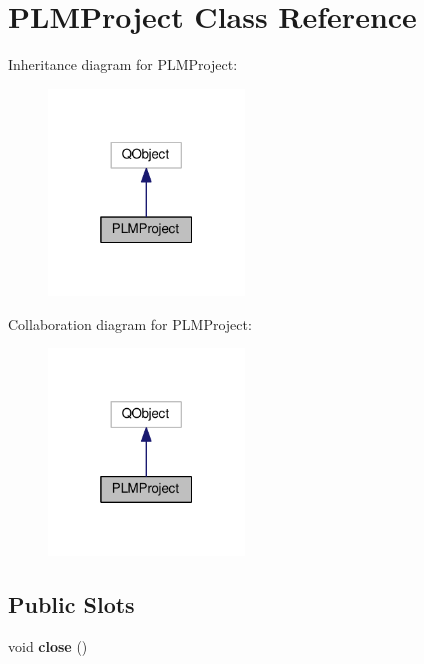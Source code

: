 \hypertarget{class_p_l_m_project}{}\section{P\+L\+M\+Project Class Reference}
\label{class_p_l_m_project}


Inheritance diagram for P\+L\+M\+Project\+:\nopagebreak
\begin{figure}[H]
\begin{center}
\leavevmode
\includegraphics[width=148pt]{class_p_l_m_project__inherit__graph}
\end{center}
\end{figure}


Collaboration diagram for P\+L\+M\+Project\+:\nopagebreak
\begin{figure}[H]
\begin{center}
\leavevmode
\includegraphics[width=148pt]{class_p_l_m_project__coll__graph}
\end{center}
\end{figure}
\subsection*{Public Slots}
\begin{DoxyCompactItemize}
\item 
void {\bfseries close} ()\hypertarget{class_p_l_m_project_a4134c6837f7a115582c18c2ef495ef83}{}\label{class_p_l_m_project_a4134c6837f7a115582c18c2ef495ef83}

\end{DoxyCompactItemize}
